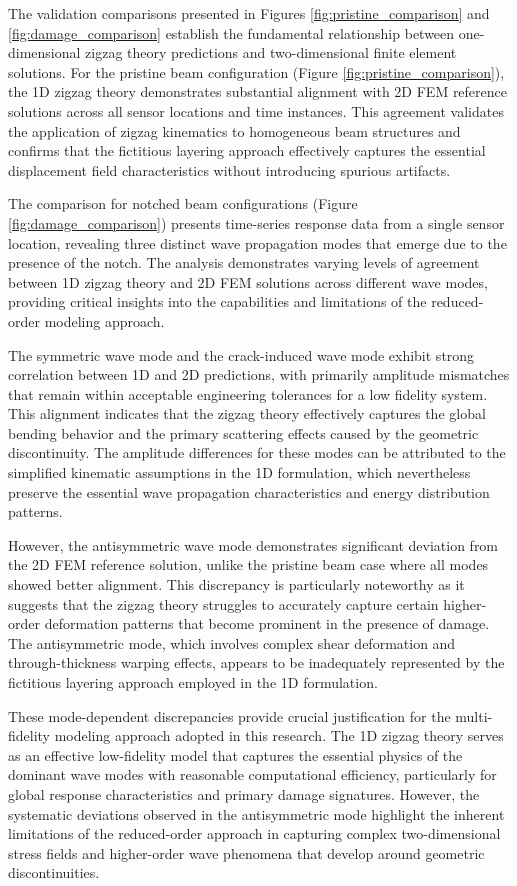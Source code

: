 \documentclass[12pt,a4paper]{report}
\begin{document}
The validation comparisons presented in Figures \ref{fig:pristine_comparison} and \ref{fig:damage_comparison} establish the fundamental relationship between one-dimensional zigzag theory predictions and two-dimensional finite element solutions. For the pristine beam configuration (Figure \ref{fig:pristine_comparison}), the 1D zigzag theory demonstrates substantial alignment with 2D FEM reference solutions across all sensor locations and time instances. This agreement validates the application of zigzag kinematics to homogeneous beam structures and confirms that the fictitious layering approach effectively captures the essential displacement field characteristics without introducing spurious artifacts.

The comparison for notched beam configurations (Figure \ref{fig:damage_comparison}) presents time-series response data from a single sensor location, revealing three distinct wave propagation modes that emerge due to the presence of the notch. The analysis demonstrates varying levels of agreement between 1D zigzag theory and 2D FEM solutions across different wave modes, providing critical insights into the capabilities and limitations of the reduced-order modeling approach.

The symmetric wave mode and the crack-induced wave mode exhibit strong correlation between 1D and 2D predictions, with primarily amplitude mismatches that remain within acceptable engineering tolerances for a low fidelity system. This alignment indicates that the zigzag theory effectively captures the global bending behavior and the primary scattering effects caused by the geometric discontinuity. The amplitude differences for these modes can be attributed to the simplified kinematic assumptions in the 1D formulation, which nevertheless preserve the essential wave propagation characteristics and energy distribution patterns.

However, the antisymmetric wave mode demonstrates significant deviation from the 2D FEM reference solution, unlike the pristine beam case where all modes showed better alignment. This discrepancy is particularly noteworthy as it suggests that the zigzag theory struggles to accurately capture certain higher-order deformation patterns that become prominent in the presence of damage. The antisymmetric mode, which involves complex shear deformation and through-thickness warping effects, appears to be inadequately represented by the fictitious layering approach employed in the 1D formulation. 

These mode-dependent discrepancies provide crucial justification for the multi-fidelity modeling approach adopted in this research. The 1D zigzag theory serves as an effective low-fidelity model that captures the essential physics of the dominant wave modes with reasonable computational efficiency, particularly for global response characteristics and primary damage signatures. However, the systematic deviations observed in the antisymmetric mode highlight the inherent limitations of the reduced-order approach in capturing complex two-dimensional stress fields and higher-order wave phenomena that develop around geometric discontinuities.
\end{document}
